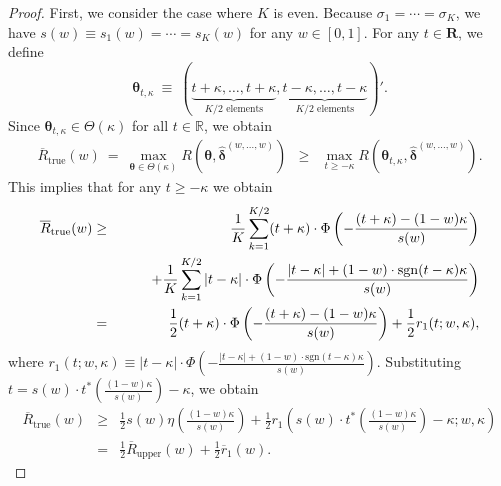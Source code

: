 \documentclass[12pt,a4paper]{article}
\begin{document}
\begin{proof}
First, we consider the case where $K$ is even. Because $\sigma_1 = \cdots = \sigma_K$, we have $s(w) \equiv s_1(w) = \cdots = s_K(w)$ for any $w \in [0,1]$. For any $t \in \mathbf{R}$, we define 
$$
\bm{\theta}_{t,\kappa} \ \equiv \ (\underbrace{t+\kappa, \ldots, t+\kappa}_{\text{$K/2$ elements}}, \underbrace{t-\kappa, \ldots, t-\kappa}_{\text{$K/2$ elements}})'.
$$
Since $\bm{\theta}_{t,\kappa} \in \Theta(\kappa)$ for all $t \in \mathbb{R}$, we obtain
\begin{eqnarray*}
\overline{R}_{\mathrm{true}}(w) \ = \ \max_{\bm{\theta} \in \Theta(\kappa)} R(\bm{\theta},\hat{\bm{\delta}}^{(w,\ldots,w)}) & \geq & \max_{t \geq -\kappa} R(\bm{\theta}_{t,\kappa},\hat{\bm{\delta}}^{(w,\ldots,w)}).
\end{eqnarray*}
This implies that for any $t \geq -\kappa$ we obtain
\begin{eqnarray}
\overline{R}_{\mathrm{true}}(w) & \geq & \frac{1}{K} \sum_{k=1}^{K/2} (t+\kappa) \cdot \Phi \left( - \frac{(t+\kappa) - (1-w) \kappa}{s(w)} \right)  \nonumber \\
& &  \hspace{0.3in} + \frac{1}{K} \sum_{k=1}^{K/2} |t-\kappa| \cdot \Phi \left( - \frac{|t-\kappa| + (1-w) \cdot \mathrm{sgn}(t-\kappa)  \kappa}{s(w)} \right) \nonumber \\
&=& \frac{1}{2}  (t+\kappa) \cdot \Phi \left( - \frac{(t+\kappa) - (1-w) \kappa}{s(w)} \right) + \frac{1}{2} r_1(t;w,\kappa), \nonumber
\end{eqnarray}
where $r_1(t;w,\kappa) \equiv |t-\kappa| \cdot \Phi \left( - \frac{|t-\kappa| + (1-w) \cdot \mathrm{sgn}(t-\kappa)  \kappa}{s(w)} \right)$. Substituting $t = s(w) \cdot t^{\ast}\left( \frac{(1-w)\kappa}{s(w)} \right) - \kappa$, we obtain
\begin{eqnarray*}
\overline{R}_{\mathrm{true}}(w) & \geq & \frac{1}{2}  s(w)  \eta\left( \frac{(1-w) \kappa}{s(w)}  \right)  + \frac{1}{2} r_1\left( s(w) \cdot t^{\ast}\left( \frac{(1-w)\kappa}{s(w)} \right) - \kappa ;  w, \kappa \right)  \\
&=& \frac{1}{2} \overline{R}_{\mathrm{upper}}(w) + \frac{1}{2} \overline{r}_1(w).
\end{eqnarray*}


\end{proof}
\end{document}
